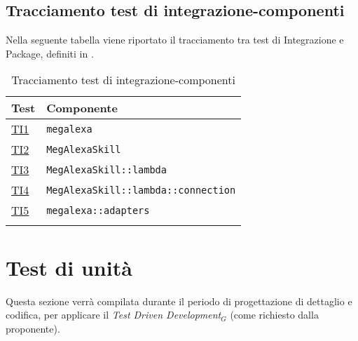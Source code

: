 \subsection{Tracciamento test di integrazione-componenti}
Nella seguente tabella viene riportato il tracciamento tra test di Integrazione e Package, definiti in \normediprogetto.
\normalsize
\begin{longtable}{|>{\centering}m{3cm}|m{9cm}<{\centering}|}
\hline
\textbf{Test} & \textbf{Componente}\\
\hline
\endhead
\hyperlink{TI1}{TI1} & \texttt{megalexa}\\ \hline
\hyperlink{TI2}{TI2} & {\texttt{MegAlexaSkill}}\\ \hline
\hyperlink{TI3}{TI3} & {\texttt{MegAlexaSkill::lambda}}\\ \hline
\hyperlink{TI4}{TI4} & {\texttt{MegAlexaSkill::lambda::connection}}\\ \hline
\hyperlink{TI5}{TI5} & {\texttt{megalexa::adapters}}\\ \hline
\caption[Tracciamento test di integrazione-componenti]{Tracciamento test di integrazione-componenti}
\label{tabella:ts-requi}
\end{longtable}

\section{Test di unità}
Questa sezione verrà compilata durante il periodo di progettazione di dettaglio e codifica, per applicare il \textit{Test Driven Development$_{G}$} (come richiesto dalla proponente).